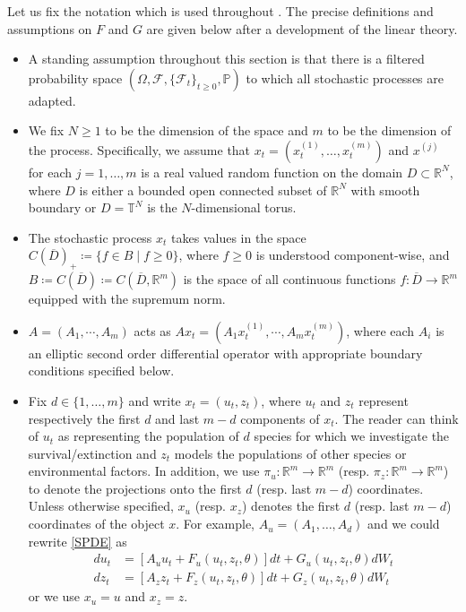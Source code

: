 \documentclass[final]{amsart}
\numberwithin{thm}{section}
\numberwithin{equation}{section}
\newcommand{\Prb}{\mathbb{P}}
\newcommand{\R}{\mathbb{R}}
\newcommand{\T}{\mathbb{T}}
\newcommand{\cdom}{C(\overline D)_+}
\begin{document}
 Let us fix the notation which is used throughout . The precise definitions and assumptions on $F$ and $G$ are given below after a development of the linear theory. 


\begin{itemize}
    \item 
    A standing assumption throughout this section is that there is a filtered probability space $(\Omega, \mathcal{F}, \{\mathcal{F}_t\}_{t \geq 0}, \Prb)$ to which all  stochastic processes are adapted.
    \item We fix $N\geq 1$ to be the dimension of the space and $m$ to be the dimension of the process. Specifically, we assume that 
    $x_t = (x^{(1)}_t, \dots,x^{(m)}_t)$ and  $x^{(j)}$ for each $j = 1, \dots, m$ is a real valued 
    random function on the domain $D \subset \R^N$, where 
    $D$ is either a bounded open connected subset of $\R^N$ with smooth boundary or $D = \T^N$ is the $N$-dimensional torus.
    \item The stochastic process $x_t$ takes values in the space $\cdom \coloneqq \{f \in B \mid f \geq 0\}$, where $f \geq 0$ is understood component-wise, and $B \coloneqq C(\overline D) \coloneqq C(\overline D, \R^m)$ is the space of all continuous functions $f: \overline D \to \R^m$ 
    equipped with the supremum norm. 
      \item $A = (A_1,\cdots,A_m)$ acts as $Ax_t = (A_1x^{(1)}_t, \cdots, A_mx_t^{(m)})$, where each $A_i$ is an elliptic second order differential operator with appropriate boundary conditions specified below.
    
    \item Fix $d \in \{1, \dots, m\}$ and write
     $x_t = (u_t,z_t)$, where $u_t$ and $z_t$ represent respectively the first $d$ and last $m-d$ components of $x_t$. The reader can think of $u_t$ as representing the population of $d$ species for which we investigate the survival/extinction and $z_t$ models the populations of other species or environmental factors. 
     In addition, 
  we use $\pi_u: \R^m \to \R^m$ (resp. $\pi_z: \R^m \to \R^m$) to denote the projections onto the first $d$ (resp. last $m-d$) coordinates. Unless otherwise specified, $x_u$ (resp. $x_z$) denotes the first $d$ (resp. last $m - d$) coordinates of the object $x$. For example, $A_u = (A_1,\dots,A_d)$ and   
 we could rewrite \eqref{SPDE} as
    \begin{align*}
        du_t &= [A_uu_t + F_u(u_t,z_t,\theta)]dt + G_u(u_t,z_t,\theta)dW_t \\
        dz_t &= [A_zz_t + F_z(u_t,z_t,\theta)]dt + G_z(u_t,z_t,\theta)dW_t 
    \end{align*}
or we use $x_u = u$ and $x_z = z$. 


\end{itemize}
\end{document}
